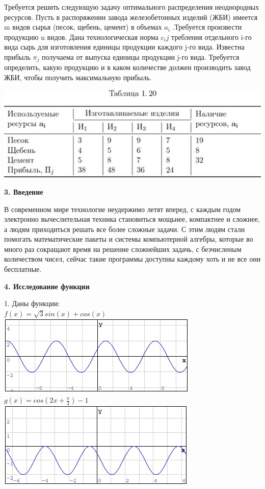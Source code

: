 \documentclass[russian,utf8,nocolumnxxxi,nocolumnxxxii]{eskdtext}
\begin{document}
Требуется решить следующую задачу оптимального распределения неоднородных ресурсов. Пусть в распоряжении завода железобетонных изделий (ЖБИ) имеется m видов сырья (песок, щебень, цемент) в объемах ${ a_i}$  .Требуется произвести продукцию { n} видов. Дана технологическая норма $c_ij$  требления отдельного i-го вида сырь для изготовления единицы продукции каждого j-го вида. Известна прибыль $\pi_j$  получаема от выпуска единицы продукции j-го вида. Требуется определить, какую продукцию и в каком количестве должен производить завод ЖБИ, чтобы получить максимальную прибыль.
\par
\includegraphics[scale=0.75]{1}
\newpage
\begin{center} {\bf3. Введение} \end{center}
\par
\normalsize В современном мире технологие неудержимо летят вперед, с каждым годом электронно вычеслительная техника становиться мощьнее, компактнее и сложнее, а людям приходиться решать все более сложные задачи. С этим людям стали помогать математические пакеты и системы компьютерной алгебры, которые во много раз сокращают время на решение сложнейших задачь, с безчисленым количеством чисел, сейчас такие программы доступны каждому хоть и не все они бесплатные.
\newpage
\begin{center}{\bf4. Исследование функции} \end{center}
\par
\normalsize1. Даны функции:
\\$f(x)=\sqrt{3}sin(x)+cos(x)$\\ \includegraphics{f(x)}
\\$g(x)=cos(2x+\frac{\pi}{3})-1$\\\includegraphics{g(x)}
\end{document}
